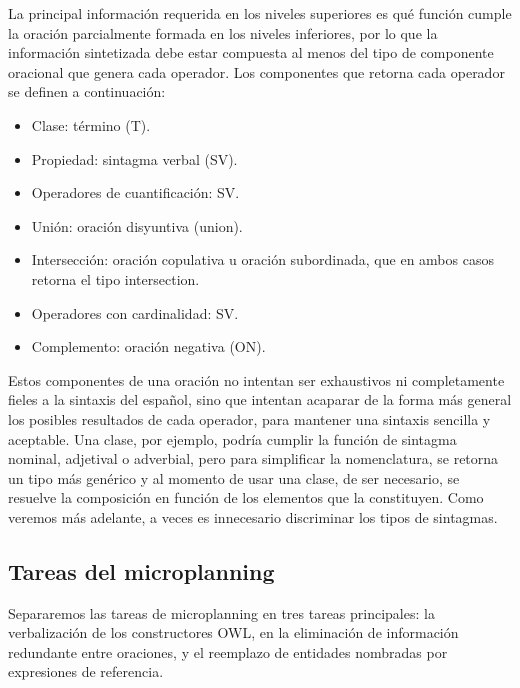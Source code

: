 La principal información requerida en los niveles superiores es qué función cumple la oración parcialmente formada en los niveles inferiores, por lo que la información sintetizada debe estar compuesta al menos del tipo de componente oracional que genera cada operador. Los componentes que retorna cada operador se definen a continuación:
\begin{itemize}
    \item Clase: término (T).
    \item Propiedad: sintagma verbal (SV).
    \item Operadores de cuantificación: SV.
    \item Unión: oración disyuntiva (union).
    \item Intersección: oración copulativa u oración subordinada, que en ambos casos retorna el tipo intersection.%
    \item Operadores con cardinalidad: SV.
    \item Complemento: oración negativa (ON).
\end{itemize}

Estos componentes de una oración no intentan ser exhaustivos ni completamente fieles a la sintaxis del español, sino que intentan acaparar de la forma más general los posibles resultados de cada operador, para mantener una sintaxis sencilla y aceptable. Una clase, por ejemplo, podría cumplir la función de sintagma nominal, adjetival o adverbial, pero para simplificar la nomenclatura, se retorna un tipo más genérico y al momento de usar una clase, de ser necesario, se resuelve la composición en función de los elementos que la constituyen. Como veremos más adelante, a veces es innecesario discriminar los tipos de sintagmas.

\subsection{Tareas del microplanning}
Separaremos las tareas de microplanning en tres tareas principales: la verbalización de los constructores OWL, en la eliminación de información redundante entre oraciones, y el reemplazo de entidades nombradas por expresiones de referencia.


